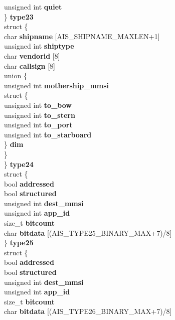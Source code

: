 \begin{DoxyCompactItemize}
{\begin{tabbing}
\>\>unsigned int {\bfseries quiet}\\
\>\} {\bfseries type23}\\
\>struct \{\\
\>\>char {\bfseries shipname} \mbox{[}AIS\_SHIPNAME\_MAXLEN+1\mbox{]}\\
\>\>unsigned int {\bfseries shiptype}\\
\>\>char {\bfseries vendorid} \mbox{[}8\mbox{]}\\
\>\>char {\bfseries callsign} \mbox{[}8\mbox{]}\\
\hypertarget{structais__t_1_1@34_1_1@55_a4ce385773b4e5cf96a12c7b1cb7a229b}{\>\>union \{\\
\>\>\>unsigned int {\bfseries mothership\_mmsi}\\
\>\>\>struct \{\\
\>\>\>\>unsigned int {\bfseries to\_bow}\\
\>\>\>\>unsigned int {\bfseries to\_stern}\\
\>\>\>\>unsigned int {\bfseries to\_port}\\
\>\>\>\>unsigned int {\bfseries to\_starboard}\\
\>\>\>\} {\bfseries dim}\\
\>\>\} }\label{structais__t_1_1@34_1_1@55_a4ce385773b4e5cf96a12c7b1cb7a229b}
\\
\>\} {\bfseries type24}\\
\>struct \{\\
\>\>bool {\bfseries addressed}\\
\>\>bool {\bfseries structured}\\
\>\>unsigned int {\bfseries dest\_mmsi}\\
\>\>unsigned int {\bfseries app\_id}\\
\>\>size\_t {\bfseries bitcount}\\
\>\>char {\bfseries bitdata} \mbox{[}(AIS\_TYPE25\_BINARY\_MAX+7)/8\mbox{]}\\
\>\} {\bfseries type25}\\
\>struct \{\\
\>\>bool {\bfseries addressed}\\
\>\>bool {\bfseries structured}\\
\>\>unsigned int {\bfseries dest\_mmsi}\\
\>\>unsigned int {\bfseries app\_id}\\
\>\>size\_t {\bfseries bitcount}\\
\>\>char {\bfseries bitdata} \mbox{[}(AIS\_TYPE26\_BINARY\_MAX+7)/8\mbox{]}\\

\end{tabbing}}
\end{DoxyCompactItemize}
